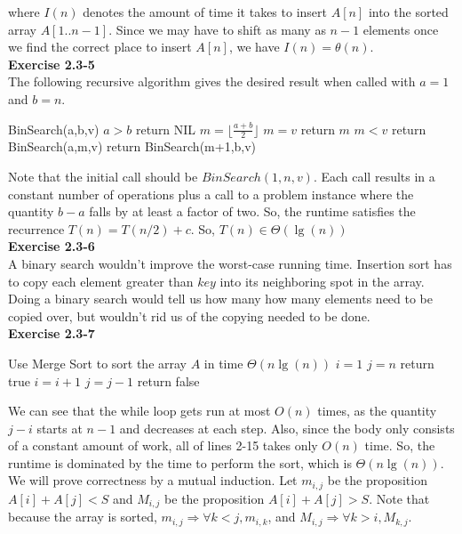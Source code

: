 \documentclass{article}
\begin{document}
where $I(n)$ denotes the amount of time it takes to insert $A[n]$ into the sorted array $A[1..n-1]$.  Since we may have to shift as many as $n-1$ elements once we find the correct place to insert $A[n]$, we have $I(n) = \theta(n)$. \\


\noindent\textbf{Exercise 2.3-5} \\

The following recursive algorithm gives the desired result when called with $a=1$ and $b=n$.

\begin{algorithm}\begin{algorithmic}[1]
\State BinSearch(a,b,v)
\If $a>b$
\State return NIL
\EndIf
\State $m = \lfloor \frac{a+b}{2}\rfloor$
\If $m=v$
\State return $m$
\EndIf
\If $m<v$
\State return BinSearch(a,m,v)
\EndIf
\State return BinSearch(m+1,b,v)
\end{algorithmic}
\end{algorithm}
Note that the initial call should be $BinSearch(1,n,v)$. Each call results in a constant number of operations plus a call to a problem instance where the quantity $b-a$ falls by at least a factor of two. So, the runtime satisfies the recurrence $T(n)= T(n/2)+c$. So, $T(n)\in\Theta(\lg(n))$ \\

\noindent\textbf{Exercise 2.3-6}\\

A binary search wouldn't improve the worst-case running time.  Insertion sort has to copy each element greater than $key$ into its neighboring spot in the array.  Doing a binary search would tell us how many how many elements need to be copied over, but wouldn't rid us of the copying needed to be done. \\

\noindent\textbf{Exercise 2.3-7}\\

\begin{algorithm} \begin{algorithmic}[1]
 \State Use Merge Sort to sort the array $A$ in time $\Theta(n\lg(n))$
\State $i=1$
\State $j = n$
 \State return true
 \EndIf
 \State $ i = i+1$
 \EndIf 
 \State $ j = j-1$
 \EndIf 
 \EndWhile
 \State return false
 \end{algorithmic}
\end{algorithm}

We can see that the while loop gets run at most $O(n)$ times, as the quantity $j-i$ starts at $n-1$ and decreases at each step. Also, since the body only consists of a constant amount of work, all of lines 2-15 takes only $O(n)$ time. So, the runtime is dominated by the time to perform the sort, which is $\Theta(n\lg(n))$. We will prove correctness by a mutual induction. Let $m_{i,j}$ be the proposition $A[i]+A[j]<S$ and $M_{i,j}$ be the proposition $A[i]+A[j]>S$. Note that because the array is sorted, $m_{i,j} \Rightarrow \forall k<j, m_{i,k}$, and $M_{i,j} \Rightarrow \forall k>i, M_{k,j}$. 
\end{document}

